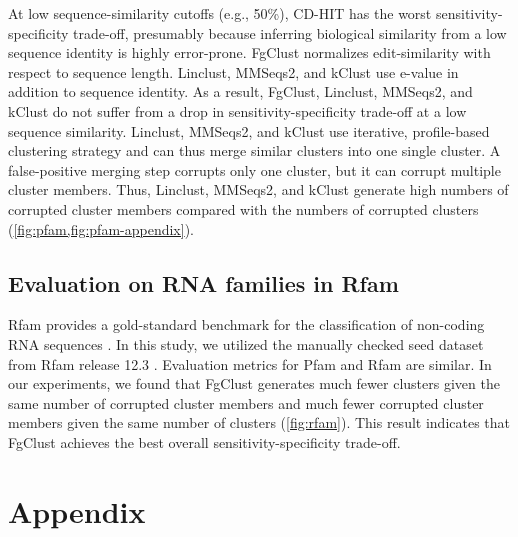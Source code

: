 \documentclass{bioinfo}
\begin{document}
At low sequence-similarity cutoffs (e.g., 50\%),
CD-HIT has the worst sensitivity-specificity trade-off, presumably because inferring biological similarity from a low sequence identity is highly error-prone.
FgClust normalizes edit-similarity with respect to sequence length.
Linclust, MMSeqs2, and kClust use e-value in addition to sequence identity.
As a result, FgClust, Linclust, MMSeqs2, and kClust do not suffer from a drop in sensitivity-specificity trade-off at a low sequence similarity.
Linclust, MMSeqs2, and kClust use iterative, profile-based clustering strategy and can thus merge similar clusters into one single cluster.
A false-positive merging step corrupts only one cluster, but it can corrupt multiple cluster members.
Thus, Linclust, MMSeqs2, and kClust generate high numbers of corrupted cluster members compared with the numbers of corrupted clusters (\cref{fig:pfam,fig:pfam-appendix}).


\subsection{Evaluation on RNA families in Rfam}

Rfam provides a gold-standard benchmark for the classification of non-coding RNA sequences \citep{nawrocki2014rfam}.
In this study, we utilized the manually checked seed dataset from Rfam release 12.3 \citep{nawrocki2014rfam}.
Evaluation metrics for Pfam and Rfam are similar.
In our experiments, we found that FgClust generates much fewer clusters given the same number of corrupted cluster members and much fewer corrupted cluster members given the same number of clusters (\cref{fig:rfam}).
This result indicates that FgClust achieves the best overall sensitivity-specificity trade-off.

\clearpage

\section*{Appendix}
\end{document}
